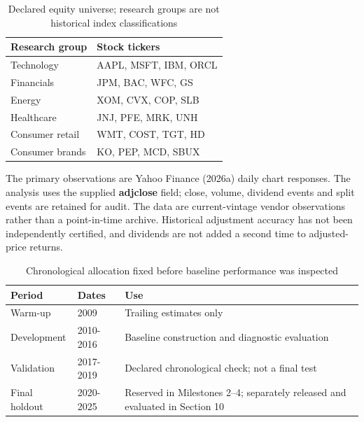 \documentclass[12pt,a4paper,oneside]{article}
\begin{document}
\begingroup
\setcounter{table}{2}
\fontsize{10}{12.5}\selectfont
\renewcommand{\arraystretch}{1.12}
\begin{table}[!htbp]
\centering
{}\fontsize{10}{12.5}\selectfont
\begin{tabular}{P{0.300000\dimexpr{}\tabcolsep\relax}P{0.700000\dimexpr{}\tabcolsep\relax}}
\toprule
{} \textbf{Research group} & \textbf{Stock tickers} \\ \midrule
Technology & AAPL, MSFT, IBM, ORCL \\
\midrule[0.2pt]
Financials & JPM, BAC, WFC, GS \\
\midrule[0.2pt]
Energy & XOM, CVX, COP, SLB \\
\midrule[0.2pt]
Healthcare & JNJ, PFE, MRK, UNH \\
\midrule[0.2pt]
Consumer retail & WMT, COST, TGT, HD \\
\midrule[0.2pt]
Consumer brands & KO, PEP, MCD, SBUX \\
\bottomrule
\end{tabular}
\caption{Declared equity universe; research groups are not historical index classifications}\label{tab:3}
\end{table}
\endgroup

The primary observations are Yahoo Finance (2026a) daily chart responses. The analysis uses the supplied \textbf{adjclose} field; close, volume, dividend events and split events are retained for audit. The data are current-vintage vendor observations rather than a point-in-time archive. Historical adjustment accuracy has not been independently certified, and dividends are not added a second time to adjusted-price returns.


\begingroup
\setcounter{table}{3}
\fontsize{10}{12.5}\selectfont
\renewcommand{\arraystretch}{1.12}
\begin{table}[!htbp]
\centering
{}\fontsize{10}{12.5}\selectfont
\begin{tabular}{P{0.200000\dimexpr{}\tabcolsep\relax}P{0.240000\dimexpr{}\tabcolsep\relax}P{0.560000\dimexpr{}\tabcolsep\relax}}
\toprule
{} \textbf{Period} & \textbf{Dates} & \textbf{Use} \\ \midrule
Warm-up & 2009 & Trailing estimates only \\
\midrule[0.2pt]
Development & 2010-2016 & Baseline construction and diagnostic evaluation \\
\midrule[0.2pt]
Validation & 2017-2019 & Declared chronological check; not a final test \\
\midrule[0.2pt]
Final holdout & 2020-2025 & Reserved in Milestones 2–4; separately released and evaluated in Section 10 \\
\bottomrule
\end{tabular}
\caption{Chronological allocation fixed before baseline performance was inspected}\label{tab:4}
\end{table}
\endgroup
\end{document}
